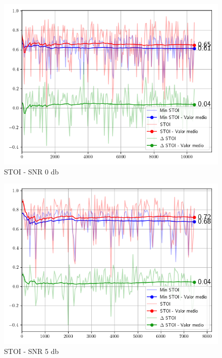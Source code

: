 \begin{figure}
	\centering
	\centerline{\includegraphics[scale=0.70]{images/ch7/objective_metrics/metric_STOI_0db.png}}
	\caption{STOI - SNR 0 db}
	\label{fig:ch7_stoi_cero_db}
\end{figure}

\begin{figure}
	\centering
	\centerline{\includegraphics[scale=0.70]{images/ch7/objective_metrics/metric_STOI_5db.png}}
	\caption{STOI - SNR 5 db}
	\label{fig:ch7_stoi_five_db}
\end{figure}

